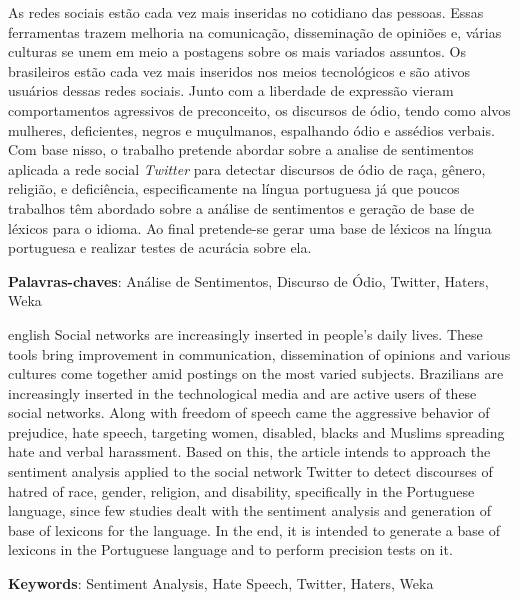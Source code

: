 \setlength{\absparsep}{18pt} %
\begin{resumo}

As redes sociais estão cada vez mais inseridas no cotidiano das pessoas. Essas ferramentas trazem melhoria na comunicação, disseminação de opiniões e, várias culturas se unem em meio a postagens sobre os mais variados assuntos. Os brasileiros estão cada vez mais inseridos nos meios tecnológicos e são ativos usuários dessas redes sociais. Junto com a liberdade de expressão vieram comportamentos agressivos de preconceito, os discursos de ódio, tendo como alvos mulheres, deficientes, negros e muçulmanos, espalhando ódio e assédios verbais. Com base nisso, o trabalho pretende abordar sobre a analise de sentimentos aplicada a rede social \textit{Twitter} para detectar discursos de ódio de raça, gênero, religião, e deficiência, especificamente na língua portuguesa já que poucos trabalhos têm abordado sobre a análise de sentimentos e geração de base de léxicos para o idioma. Ao final pretende-se gerar uma base de léxicos na língua portuguesa e realizar testes de acurácia sobre ela.

 \textbf{Palavras-chaves}: Análise de Sentimentos, Discurso de Ódio, Twitter, Haters, Weka
\end{resumo}

\begin{resumo}[Abstract]
 \begin{otherlanguage*}{english}
   Social networks are increasingly inserted in people's daily lives. These tools bring improvement in communication, dissemination of opinions and various cultures come together amid postings on the most varied subjects. Brazilians are increasingly inserted in the technological media and are active users of these social networks. Along with freedom of speech came the aggressive behavior of prejudice, hate speech, targeting women, disabled, blacks and Muslims spreading hate and verbal harassment. Based on this, the article intends to approach the sentiment analysis applied to the social network Twitter to detect discourses of hatred of race, gender, religion, and disability, specifically in the Portuguese language, since few studies dealt with the sentiment analysis and generation of base of lexicons for the language. In the end, it is intended to generate a base of lexicons in the Portuguese language and to perform precision tests on it.

   \vspace{\onelineskip}
 
   \noindent 
   \textbf{Keywords}: Sentiment Analysis, Hate Speech, Twitter, Haters, Weka
 \end{otherlanguage*}
\end{resumo}
